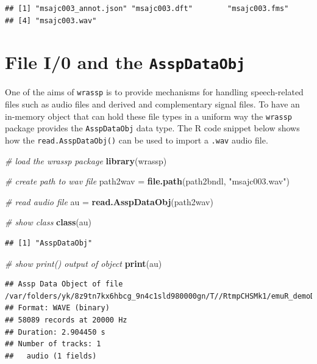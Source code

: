 \documentclass[]{book}
\newenvironment{Shaded}{\begin{snugshade}}{\end{snugshade}}
\newcommand{\CommentTok}[1]{\textcolor[rgb]{0.56,0.35,0.01}{\textit{#1}}}
\newcommand{\KeywordTok}[1]{\textcolor[rgb]{0.13,0.29,0.53}{\textbf{#1}}}
\newcommand{\NormalTok}[1]{#1}
\newcommand{\StringTok}[1]{\textcolor[rgb]{0.31,0.60,0.02}{#1}}
\begin{document}
\begin{verbatim}
## [1] "msajc003_annot.json" "msajc003.dft"        "msajc003.fms"       
## [4] "msajc003.wav"
\end{verbatim}

\hypertarget{file-i0-and-the-asspdataobj}{%
\section{\texorpdfstring{File I/0 and the \texttt{AsspDataObj}}{File I/0 and the AsspDataObj}}\label{file-i0-and-the-asspdataobj}}

One of the aims of \texttt{wrassp} is to provide mechanisms for handling speech-related files such as audio files and derived and complementary signal files. To have an in-memory object that can hold these file types in a uniform way the \texttt{wrassp} package provides the \texttt{AsspDataObj} data type. The R code snippet below shows how the \texttt{read.AsspDataObj()} can be used to import a \texttt{.wav} audio file.

\begin{Shaded}
\begin{Highlighting}[]
\CommentTok{# load the wrassp package}
\KeywordTok{library}\NormalTok{(wrassp)}

\CommentTok{# create path to wav file}
\NormalTok{path2wav =}\StringTok{ }\KeywordTok{file.path}\NormalTok{(path2bndl, }\StringTok{"msajc003.wav"}\NormalTok{)}

\CommentTok{# read audio file}
\NormalTok{au =}\StringTok{ }\KeywordTok{read.AsspDataObj}\NormalTok{(path2wav)}

\CommentTok{# show class}
\KeywordTok{class}\NormalTok{(au)}
\end{Highlighting}
\end{Shaded}

\begin{verbatim}
## [1] "AsspDataObj"
\end{verbatim}

\begin{Shaded}
\begin{Highlighting}[]
\CommentTok{# show print() output of object}
\KeywordTok{print}\NormalTok{(au)}
\end{Highlighting}
\end{Shaded}

\begin{verbatim}
## Assp Data Object of file /var/folders/yk/8z9tn7kx6hbcg_9n4c1sld980000gn/T//RtmpCHSMk1/emuR_demoData/ae_emuDB/0000_ses/msajc003_bndl/msajc003.wav.
## Format: WAVE (binary)
## 58089 records at 20000 Hz
## Duration: 2.904450 s
## Number of tracks: 1 
##   audio (1 fields)
\end{verbatim}
\end{document}
